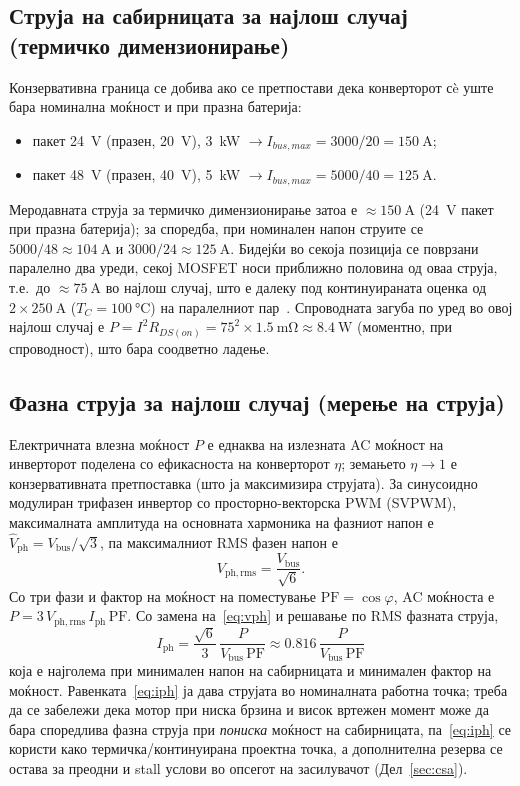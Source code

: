 \documentclass[journal,onecolumn,11pt]{IEEEtran}
\newcommand{\Vdcbus}{V_{\mathrm{bus}}}
\newcommand{\Iphrms}{I_{\mathrm{ph}}}
\begin{document}
\subsection{Струја на сабирницата за најлош случај (термичко димензионирање)}
Конзервативна граница се добива ако се претпостави дека конверторот сè уште бара
номинална моќност и при празна батерија:
\begin{itemize}[leftmargin=1.4em]
  \item пакет \SI{24}{\volt} (празен, \SI{20}{\volt}), \SI{3}{\kilo\watt}
        $\rightarrow I_{bus,max}=3000/20=\SI{150}{\ampere}$;
  \item пакет \SI{48}{\volt} (празен, \SI{40}{\volt}), \SI{5}{\kilo\watt}
        $\rightarrow I_{bus,max}=5000/40=\SI{125}{\ampere}$.
\end{itemize}
Меродавната струја за термичко димензионирање затоа е $\approx\SI{150}{\ampere}$
(\SI{24}{\volt} пакет при празна батерија); за споредба, при номинален напон струите
се $5000/48\approx\SI{104}{\ampere}$ и $3000/24\approx\SI{125}{\ampere}$. Бидејќи во
секоја позиција се поврзани паралелно два уреди, секој MOSFET носи приближно
половина од оваа струја, т.е.\ до $\approx\SI{75}{\ampere}$ во најлош случај, што е
далеку под континуираната оценка од $2\times\SI{250}{\ampere}$ ($T_C=\SI{100}{\celsius}$)
на паралелниот пар~\cite{ipt015ds}. Спроводната загуба по уред во овој најлош
случај е $P=I^2R_{DS(on)}=75^2\times\SI{1.5}{\milli\ohm}\approx\SI{8.4}{\watt}$
(моментно, при спроводност), што бара соодветно ладење.

\subsection{Фазна струја за најлош случај (мерење на струја)}
Електричната влезна моќност $P$ е еднаква на излезната AC моќност на инверторот
поделена со ефикасноста на конверторот $\eta$; земањето $\eta\!\to\!1$ е
конзервативната претпоставка (што ја максимизира струјата). За синусоидно модулиран
трифазен инвертор со просторно-векторска PWM (SVPWM), максималната амплитуда на
основната хармоника на фазниот напон е $\hat V_{\mathrm{ph}}=\Vdcbus/\sqrt{3}$, па
максималниот RMS фазен напон е
\begin{equation}
V_{\mathrm{ph,rms}}=\frac{\Vdcbus}{\sqrt{6}} .
\label{eq:vph}
\end{equation}
Со три фази и фактор на моќност на поместување $\mathrm{PF}=\cos\varphi$, AC моќноста
е $P=3\,V_{\mathrm{ph,rms}}\,\Iphrms\,\mathrm{PF}$. Со замена на~\eqref{eq:vph} и
решавање по RMS фазната струја,
\begin{equation}
\boxed{\;\Iphrms=\frac{\sqrt{6}}{3}\,\frac{P}{\Vdcbus\,\mathrm{PF}}
        \approx 0.816\,\frac{P}{\Vdcbus\,\mathrm{PF}}\;}
\label{eq:iph}
\end{equation}
која е најголема при минимален напон на сабирницата и минимален фактор на моќност.
Равенката~\eqref{eq:iph} ја дава струјата во номиналната работна точка; треба да се
забележи дека мотор при ниска брзина и висок вртежен момент може да бара споредлива
фазна струја при \emph{пониска} моќност на сабирницата, па~\eqref{eq:iph} се користи
како термичка/континуирана проектна точка, а дополнителна резерва се остава за
преодни и stall услови во опсегот на засилувачот (Дел~\ref{sec:csa}).
\end{document}

